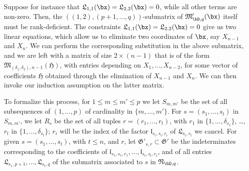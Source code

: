 \documentclass[12pt]{article}
\begin{document}
Suppose for instance that
$\mathfrak{L}_{1,1}(\bx)=\mathfrak{L}_{2,2}(\bx)=0$, while all other
terms are non-zero. Then, the $((1,2),(p+1,\dots,q))$-submatrix of
${\mathfrak{M}_{\bD,q}'}(\bx)$ itself must be rank-deficient.  The
constraints $\mathfrak{L}_{1,1}(\bx)=\mathfrak{L}_{2,2}(\bx)=0$ give
us two linear equations, which allow us to eliminate two coordinates
of $\bx$, say $X_{n-1}$ and $X_n$. We can perform the corresponding
substitution in the above submatrix, and we are left with a matrix of
size $2 \times (n-1)$ that is of the form
$\mathfrak{M}_{(\delta_1,\delta_2),n-1}(\mathfrak{H})$, with entries depending
on $X_1,\dots,X_{n-2}$, for some vector of coefficients $\mathfrak{H}$
obtained through the elimination of $X_{n-1}$ and $X_n$. We can then
invoke our induction assumption on the latter matrix.

To formalize this process, for $1 \le m \le m' \le p$ we let
$S_{m,m'}$ be the set of all subsequences of $(1,\dots,p)$ of
cardinality in $\{m,\dots,m'\}$. For $s=(s_1,\dots,s_t)$ in
$S_{m,m'}$, we let $R_s$ be the set of all tuples $r=(r_1,\dots,r_t)$,
with $r_1$ in $\{1,\dots,\delta_{s_1}\}$, \dots, $r_t$ in
$\{1,\dots,\delta_{s_t}\}$; $r_i$ will be the index of the factor
$\mathfrak{l}_{s_i,s_i,r_i}$ of $\mathfrak{L}_{s_i,s_i}$ we
cancel. For given $s=(s_1,\dots,s_t)$, with $t \le n$, and $r$, let
$\mathfrak{G}'_{s,r} \subset \mathfrak{G}'$ be the indeterminates
corresponding to the coefficients of
$\mathfrak{l}_{s_1,s_1,r_1},\dots,\mathfrak{l}_{s_t,s_t,r_t}$, and of
all entries $\mathfrak{L}_{s_1,p+1},\dots,\mathfrak{L}_{s_t,q}$ of the
submatrix associated to $s$ in $\mathfrak{N}_{\bD,q}$.
\end{document}
